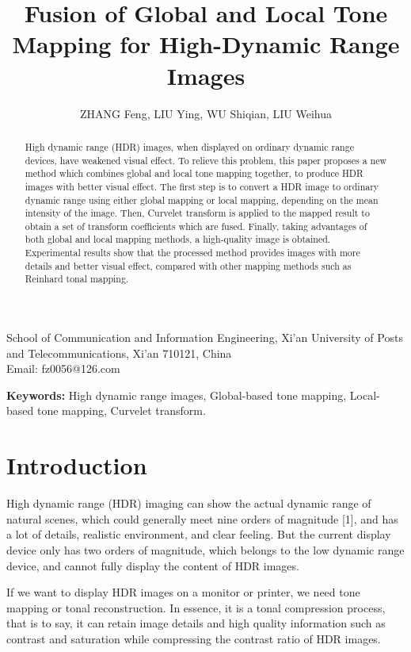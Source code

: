 \documentclass[11pt]{article}
\begin{document}
\title{Fusion of Global and Local Tone Mapping for High-Dynamic Range Images}
\author{ZHANG Feng, LIU Ying, WU Shiqian, LIU Weihua}
\date{}
\maketitle

\noindent School of Communication and Information Engineering, Xi'an University of Posts and Telecommunications, Xi'an 710121, China\\
Email: fz0056@126.com

\begin{abstract}
High dynamic range (HDR) images, when displayed on ordinary dynamic range devices, have weakened visual effect. To relieve this problem, this paper proposes a new method which combines global and local tone mapping together, to produce HDR images with better visual effect. The first step is to convert a HDR image to ordinary dynamic range using either global mapping or local mapping, depending on the mean intensity of the image. Then, Curvelet transform is applied to the mapped result to obtain a set of transform coefficients which are fused. Finally, taking advantages of both global and local mapping methods, a high-quality image is obtained. Experimental results show that the processed method provides images with more details and better visual effect, compared with other mapping methods such as Reinhard tonal mapping.
\end{abstract}

\textbf{Keywords:} High dynamic range images, Global-based tone mapping, Local-based tone mapping, Curvelet transform.

\section{Introduction}

High dynamic range (HDR) imaging can show the actual dynamic range of natural scenes, which could generally meet nine orders of magnitude [1], and has a lot of details, realistic environment, and clear feeling. But the current display device only has two orders of magnitude, which belongs to the low dynamic range device, and cannot fully display the content of HDR images.

If we want to display HDR images on a monitor or printer, we need tone mapping or tonal reconstruction. In essence, it is a tonal compression process, that is to say, it can retain image details and high quality information such as contrast and saturation while compressing the contrast ratio of HDR images.
\end{document}
